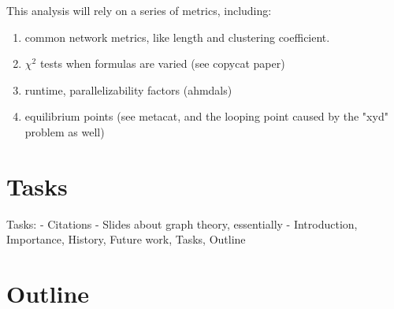 \documentclass{nature}
\begin{document}
    This analysis will rely on a series of metrics, including:
    \begin{enumerate}
        \item common network metrics, like length and clustering coefficient.
        \item $\chi ^2$ tests when formulas are varied (see copycat paper)
        \item runtime, parallelizability factors (ahmdals)
        \item equilibrium points (see metacat, and the looping point caused by the "xyd" problem as well)
    \end{enumerate}


\section{Tasks}

Tasks:
 - Citations
 - Slides about graph theory, essentially
 - Introduction, Importance, History, Future work, Tasks, Outline

\section{Outline}
\end{document}
